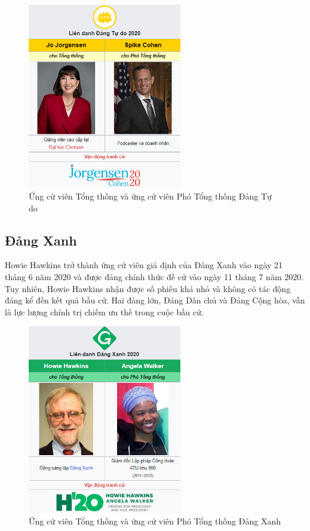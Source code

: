 \documentclass[14pt, a4paper]{article}
\numberwithin{equation}{section}
\numberwithin{figure}{section}
\numberwithin{dl}{section}
\numberwithin{md}{section}
\numberwithin{bd}{section}
\numberwithin{dn}{section}
\numberwithin{hq}{section}
\begin{document}
    \begin{figure}[h!]
        \centering
        \includegraphics[width=0.6\textwidth]{Lib_Candidates.png}
        \caption{Ứng cử viên Tổng thống và ứng cử viên Phó Tổng thống Đảng Tự do}
    \end{figure}

    \subsection{Đảng Xanh}

    Howie Hawkins trở thành ứng cử viên giả định của Đảng Xanh vào ngày 21 tháng 6 năm 2020 và được đảng chính thức đề cử vào ngày 11 tháng 7 năm 2020.
    Tuy nhiên, Howie Hawkins nhận được số phiếu khá nhỏ và không có tác động đáng kể đến kết quả bầu cử. 
    Hai đảng lớn, Đảng Dân chủ và Đảng Cộng hòa, vẫn là lực lượng chính trị chiếm ưu thế trong cuộc bầu cử.

    \begin{figure}[h!]
        \centering
        \includegraphics[width=0.6\textwidth]{Green_Candidates.png}
        \caption{Ứng cử viên Tổng thống và ứng cử viên Phó Tổng thống Đảng Xanh}
    \end{figure}
\end{document}
